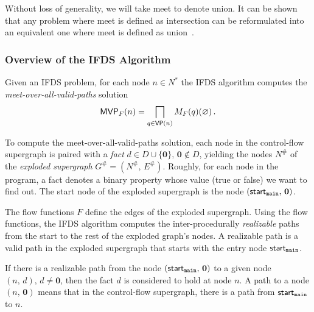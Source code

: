 Without loss of generality, we will take meet to denote union. It can be shown that any problem where meet is defined as intersection can be reformulated into an equivalent one where meet is defined as union~\cite{reps1995precise}.

\subsubsection{Overview of the IFDS Algorithm}\label{sec:overviewifds}
Given an IFDS problem, for each node $n\in N^*$ the IFDS algorithm computes the \textit{meet-over-all-valid-paths} solution
\begin{equation}
 \textsf{MVP}_{F}(n)=\bigsqcap_{q\in\textsf{VP}(n)}M_F(q)(\varnothing)\,.
\end{equation}

To compute the meet-over-all-valid-paths solution, each node in the control-flow supergraph is paired with a \textit{fact} $d\in D\cup\{\mathbf0\},\,\mathbf0\notin D$, yielding the nodes $N^\#$ of the \textit{exploded supergraph} $G^\#=(N^\#,\,E^\#)$.
Roughly, for each node in the program, a fact denotes a binary property whose value (true or false) we want to find out.
The start node of the exploded supergraph is the node $(\textsf{start}_\texttt{main},\,\mathbf0)$.

The flow functions $F$ define the edges of the exploded supergraph.
Using the flow functions, the IFDS algorithm computes the inter-procedurally \textit{realizable} paths from the start to the rest of the exploded graph's nodes. A realizable path is a valid path in the exploded supergraph that starts with the entry node $\textsf{start}_\texttt{main}$.

If there is a realizable path from the node $(\textsf{start}_\texttt{main},\,\mathbf0)$ to a given node $(n,\,d),\,d\ne\mathbf0$, then the fact $d$ is considered to hold at node $n$. A path to a node $(n,\,\mathbf0)$ means that in the control-flow supergraph, there is a path from $\textsf{start}_\texttt{main}$ to $n$.


